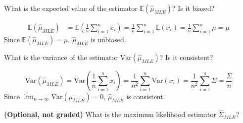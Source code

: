 \documentclass{article}
\newcommand{\E}{\mathbb{E}}
\newcommand{\V}{\text{Var}}
\begin{document}
\begin{probset}
\begin{prob}
\begin{subprobset}
    \begin{subprob}
        What is the expected value of the estimator $\E (\hat{\mu}_{MLE})$? Is it biased?

        \begin{soln}
            \begin{align*}
                \E (\hat{\mu}_{MLE}) &= \E \left(\frac{1}{n} \sum_{i=1}^n x_i\right) = \frac{1}{n} \sum_{i=1}^n \E (x_i) = \frac{1}{n} \sum_{i=1}^n \mu = \mu
            \end{align*}
            Since $\E (\hat{\mu}_{MLE}) = \mu$, $\hat{\mu}_{MLE}$ is unbiased.
        \end{soln}
    \end{subprob}

    \newpage

    \begin{subprob}
        What is the variance of the estimator $\V(\hat{\mu}_{MLE})$? Is it consistent?

        \begin{soln}
            \[
                \V(\hat{\mu}_{MLE}) = \V\left(\frac{1}{n} \sum_{i=1}^n x_i\right) = \frac{1}{n^2} \sum_{i=1}^n \V(x_i) = \frac{1}{n^2} \sum_{i=1}^n \Sigma = \frac{\Sigma}{n}
            \]
            Since $\lim_{n \to \infty} \V(\hat{\mu}_{MLE}) = 0$, $\hat{\mu}_{MLE}$ is consistent.
        \end{soln}
    \end{subprob}

    \begin{subprob}
        \textbf{(Optional, not graded)} What is the maximum likelihood estimator $\hat{\Sigma}_{MLE}$?


\end{subprob}
\end{subprobset}
\end{prob}
\end{probset}
\end{document}
